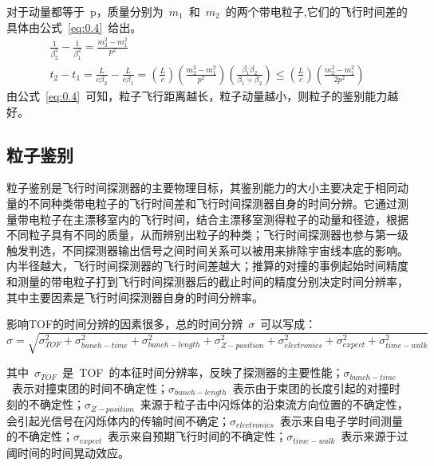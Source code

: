 
对于动量都等于~p，质量分别为~$m_{1}$~和~$m_{2}$~的两个带电粒子,它们的飞行时间差的具体由公式~\ref{eq:0.4}~给出。
\begin{align}
\frac{1}{\beta^{2}_{2}}-\frac{1}{\beta^{2}_{1}}=\frac{m^{2}_{2}-m^{2}_{1}}{p^{2}}
\label{eq:0.3}\\
t_{2}-t_{1}=\frac{L}{c\beta_{2}}-\frac{L}{c\beta_{1}}=(\frac{L}{c})(\frac{m^{2}_{2}-m^{2}_{1}}{p^{2}})(\frac{\beta_{1}\beta_{2}}{\beta_{1}+\beta_{2}})\leq(\frac{L}{c})(\frac{m^{2}_{2}-m^{2}_{1}}{2p^{2}})
\label{eq:0.4}
\end{align}
由公式~\ref{eq:0.4}~可知，粒子飞行距离越长，粒子动量越小，则粒子的鉴别能力越好。

\subsection{粒子鉴别}
粒子鉴别是飞行时间探测器的主要物理目标，其鉴别能力的大小主要决定于相同动量的不同种类带电粒子的飞行时间差和飞行时间探测器自身的时间分辨。它通过测量带电粒子在主漂移室内的飞行时间，结合主漂移室测得粒子的动量和径迹，根据不同粒子具有不同的质量，从而辨别出粒子的种类；飞行时间探测器也参与第一级触发判选，不同探测器输出信号之间时间关系可以被用来排除宇宙线本底的影响。内半径越大，飞行时间探测器的飞行时间差越大；推算的对撞的事例起始时间精度和测量的带电粒子打到飞行时间探测器后的截止时间的精度分别决定时间分辨率，其中主要因素是飞行时间探测器自身的时间分辨率。

影响TOF的时间分辨的因素很多，总的时间分辨~$\sigma$~可以写成：
\begin{displaymath}
\sigma=\sqrt{\sigma_{TOF}^{2}+\sigma_{bunch-time}^{2}+\sigma_{bunch-length}^{2}+\sigma_{Z-position}^{2}+\sigma_{electronics}^{2}+\sigma_{expect}^{2}+\sigma_{time-walk}^{2}}
\end{displaymath}

其中~$\sigma_{TOF}$~是~TOF~的本征时间分辨率，反映了探测器的主要性能；$\sigma_{bunch-time}$~表示对撞束团的时间不确定性；$\sigma_{bunch-length}$~表示由于束团的长度引起的对撞时刻的不确定性；$\sigma_{Z-position}$~来源于粒子击中闪烁体的沿束流方向位置的不确定性，会引起光信号在闪烁体内的传输时间不确定；$\sigma_{electronics}$~表示来自电子学时间测量的不确定性；$\sigma_{expect}$~表示来自预期飞行时间的不确定性；$\sigma_{time-walk}$~表示来源于过阈时间的时间晃动效应。

